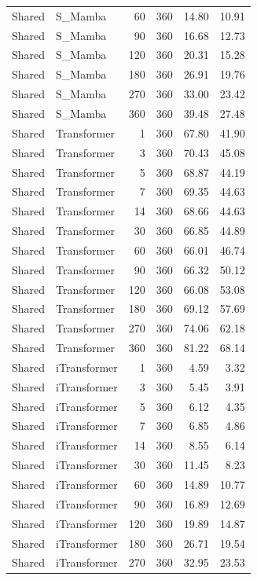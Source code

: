 {\begin{longtable}{llrrrr}
Shared & S\_Mamba & 60 & 360 & 14.80 & 10.91 \\
Shared & S\_Mamba & 90 & 360 & 16.68 & 12.73 \\
Shared & S\_Mamba & 120 & 360 & 20.31 & 15.28 \\
Shared & S\_Mamba & 180 & 360 & 26.91 & 19.76 \\
Shared & S\_Mamba & 270 & 360 & 33.00 & 23.42 \\
Shared & S\_Mamba & 360 & 360 & 39.48 & 27.48 \\
Shared & Transformer & 1 & 360 & 67.80 & 41.90 \\
Shared & Transformer & 3 & 360 & 70.43 & 45.08 \\
Shared & Transformer & 5 & 360 & 68.87 & 44.19 \\
Shared & Transformer & 7 & 360 & 69.35 & 44.63 \\
Shared & Transformer & 14 & 360 & 68.66 & 44.63 \\
Shared & Transformer & 30 & 360 & 66.85 & 44.89 \\
Shared & Transformer & 60 & 360 & 66.01 & 46.74 \\
Shared & Transformer & 90 & 360 & 66.32 & 50.12 \\
Shared & Transformer & 120 & 360 & 66.08 & 53.08 \\
Shared & Transformer & 180 & 360 & 69.12 & 57.69 \\
Shared & Transformer & 270 & 360 & 74.06 & 62.18 \\
Shared & Transformer & 360 & 360 & 81.22 & 68.14 \\
Shared & iTransformer & 1 & 360 & 4.59 & 3.32 \\
Shared & iTransformer & 3 & 360 & 5.45 & 3.91 \\
Shared & iTransformer & 5 & 360 & 6.12 & 4.35 \\
Shared & iTransformer & 7 & 360 & 6.85 & 4.86 \\
Shared & iTransformer & 14 & 360 & 8.55 & 6.14 \\
Shared & iTransformer & 30 & 360 & 11.45 & 8.23 \\
Shared & iTransformer & 60 & 360 & 14.89 & 10.77 \\
Shared & iTransformer & 90 & 360 & 16.89 & 12.69 \\
Shared & iTransformer & 120 & 360 & 19.89 & 14.87 \\
Shared & iTransformer & 180 & 360 & 26.71 & 19.54 \\
Shared & iTransformer & 270 & 360 & 32.95 & 23.53 \\

\end{longtable}}
